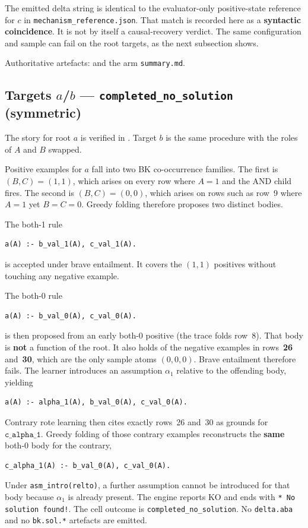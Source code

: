 \documentclass[11pt]{article}
\begin{document}
The emitted delta string is identical to the evaluator-only positive-state
reference for \(c\) in \texttt{mechanism\_reference.json}.
That match is recorded here as a \textbf{syntactic coincidence}.
It is not by itself a causal-recovery verdict.
The same configuration and sample can fail on the root targets, as the next
subsection shows.

Authoritative artefacts:
and the arm \texttt{summary.md}.

\subsection{Targets \texorpdfstring{\(a\)}{a}/\texorpdfstring{\(b\)}{b} --- \texttt{completed\_no\_solution} (symmetric)}

The story for root \(a\) is verified in
.
Target \(b\) is the same procedure with the roles of \(A\) and \(B\) swapped.

Positive examples for \(a\) fall into two BK co-occurrence families.
The first is \((B,C)=(1,1)\), which arises on every row where \(A=1\) and the
AND child fires.
The second is \((B,C)=(0,0)\), which arises on rows such as row~9 where \(A=1\)
yet \(B=C=0\).
Greedy folding therefore proposes two distinct bodies.

The both-1 rule
\begin{verbatim}
a(A) :- b_val_1(A), c_val_1(A).
\end{verbatim}
is accepted under brave entailment.
It covers the \((1,1)\) positives without touching any negative example.

The both-0 rule
\begin{verbatim}
a(A) :- b_val_0(A), c_val_0(A).
\end{verbatim}
is then proposed from an early both-0 positive (the trace folds row~8).
That body is \textbf{not} a function of the root.
It also holds of the negative examples in rows~\textbf{26} and~\textbf{30},
which are the only sample atoms \((0,0,0)\).
Brave entailment therefore fails.
The learner introduces an assumption \(\alpha_1\) relative to the offending
body, yielding
\begin{verbatim}
a(A) :- alpha_1(A), b_val_0(A), c_val_0(A).
\end{verbatim}
Contrary rote learning then cites exactly rows~26 and~30 as grounds for
\(\mathtt{c\_alpha\_1}\).
Greedy folding of those contrary examples reconstructs the \textbf{same}
both-0 body for the contrary,
\begin{verbatim}
c_alpha_1(A) :- b_val_0(A), c_val_0(A).
\end{verbatim}
Under \texttt{asm\_intro(relto)}, a further assumption cannot be introduced for
that body because \(\alpha_1\) is already present.
The engine reports KO and ends with \texttt{* No solution found!}.
The cell outcome is \texttt{completed\_no\_solution}.
No \texttt{delta.aba} and no \texttt{bk.sol.*} artefacts are emitted.
\end{document}
